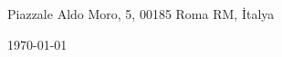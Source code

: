 \begin{minipage}{0.49\textwidth}
\begin{flushleft}
\noindent
Piazzale Aldo Moro, 5, 00185 Roma RM, İtalya
\end{flushleft}
\end{minipage}
\begin{minipage}{0.47\textwidth}
\begin{flushright}
\today
\end{flushright}
\end{minipage} \\

\newcommand{\univ}{Sapienza University of Rome}
\newcommand{\univshort}{USomething}
\newcommand{\dept}{Computer Science}
\newcommand{\degree}{M.Sc}


